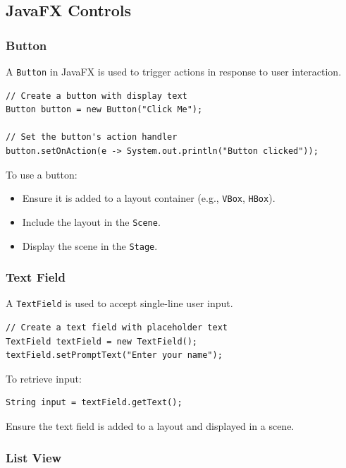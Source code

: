 \documentclass{article}
\newcommand{\codecmd}[1]{\textcolor[rgb]{0,0.5,0}{\texttt{#1}}}
\begin{document}
\subsection{JavaFX Controls}

\subsubsection{Button}

A \codecmd{Button} in JavaFX is used to trigger actions in response to user interaction.

\begin{verbatim}
// Create a button with display text
Button button = new Button("Click Me");

// Set the button's action handler
button.setOnAction(e -> System.out.println("Button clicked"));
\end{verbatim}

To use a button:
\begin{itemize}
    \item Ensure it is added to a layout container (e.g., \codecmd{VBox}, \codecmd{HBox}).
    \item Include the layout in the \codecmd{Scene}.
    \item Display the scene in the \codecmd{Stage}.
\end{itemize}

\subsubsection{Text Field}

A \codecmd{TextField} is used to accept single-line user input.

\begin{verbatim}
// Create a text field with placeholder text
TextField textField = new TextField();
textField.setPromptText("Enter your name");
\end{verbatim}

\noindent To retrieve input:
\begin{verbatim}
String input = textField.getText();
\end{verbatim}

Ensure the text field is added to a layout and displayed in a scene.

\subsubsection{List View}
\end{document}

